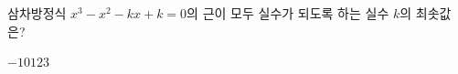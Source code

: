 삼차방정식 $x^3-x^2-kx+k=0$의 근이 모두 실수가 되도록 하는 실수 $k$의 최솟값은?
\begin{choices32}{$-1$}{$0$}{$1$}{$2$}{$3$}\end{choices32}
